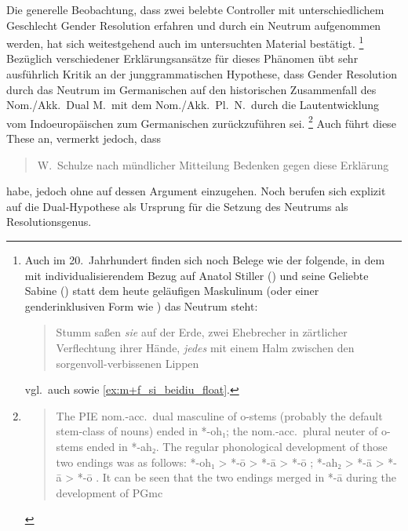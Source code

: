 Die generelle Beobachtung, dass zwei belebte Controller mit unterschiedlichem
Geschlecht Gender Resolution erfahren und durch ein Neutrum aufgenommen werden,
hat sich weitestgehend auch im untersuchten Material bestätigt.%
%
	\footnote{Auch im 20.~Jahrhundert finden sich noch Belege wie der folgende,
		in dem mit individualisierendem Bezug auf Anatol Stiller (\MascM) und
		seine Geliebte Sabine (\FemF) statt dem heute geläufigen Maskulinum
		(oder einer genderinklusiven Form wie ) das Neutrum steht:
		\blockquote[{\cites(Hervorhebung und Annotation
		CB)[332--333]{frisch:stiller}}]{Stumm saßen \emph{sie}
		 auf der Erde, zwei Ehebrecher in
		zärtlicher Verflechtung ihrer Hände, \emph{jedes}
		 mit einem Halm zwischen den
		sorgenvoll-ver\-bis\-senen Lippen \textelp{}};
		vgl.~auch \textcite[188]{dal2014} sowie \cref{ex:m+f_si_beidiu_float}.
	}
%
Bezüglich verschiedener Erklärungs\-ansätze für dieses Phänomen übt
\citet[213--221]{askedal1973} sehr ausführlich Kritik an der junggrammatischen
Hypothese, dass Gender Resolution durch das Neutrum im Germanischen auf den
historischen Zusammenfall des Nom./Akk.\ Dual M.\ mit dem Nom./Akk.~Pl.~N.\
durch die Laut\-entwicklung vom Indoeuropäischen zum Germanischen
zurückzuführen sei.%
%
	\footnote{\foreignblockcquote{english}[196]{ringe2017}{The PIE nom.-acc.\
		dual masculine of o-stems (probably the default stem-class of nouns)
		ended in *-oh₁; the nom.-acc.\ plural neuter of o-stems ended in *-ah₂.
		The regular phonological development of those two endings was as
		follows: *-oh₁ > *-ō \textelp{} > *-ā > *-ō \textelp{}; *-ah₂ > *-ā
		\textelp{} > *-ā > *-ō \textelp{}. It can be seen that the two endings
		merged in *-ā during the development of PGmc}.%
	}
%
Auch \citeauthor{behaghel1928} führt diese These an, vermerkt jedoch, dass
\blockcquote[40]{behaghel1928}{W.~Schulze \textelp{} nach mündlicher Mitteilung
Bedenken gegen diese Erklärung} habe, jedoch ohne auf dessen Argument
einzugehen. Noch \textcites[157]{hock2008}[196]{ringe2017}[104]{miller2019}
berufen sich explizit auf die Dual-Hypothese als Ursprung für die Setzung des
Neutrums als Resolutionsgenus.

